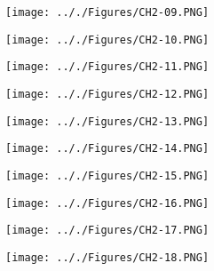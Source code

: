 \documentclass[onecolumn,11pt]{report}
\def\lthtmlcheckvsize{\ifdim\ht\sizebox<\vsize 
  \ifdim\wd\sizebox<\hsize\expandafter\hfill\fi \expandafter\vfill
  \else\expandafter\vss\fi}%
\begin{document}
{\newpage\clearpage
{}%
\texttt{[image: .././Figures/CH2-09.PNG]}%
\lthtmlpictureZ
\lthtmlcheckvsize\clearpage}

{\newpage\clearpage
{}%
\texttt{[image: .././Figures/CH2-10.PNG]}%
\lthtmlpictureZ
\lthtmlcheckvsize\clearpage}

{\newpage\clearpage
{}%
\texttt{[image: .././Figures/CH2-11.PNG]}%
\lthtmlpictureZ
\lthtmlcheckvsize\clearpage}

{\newpage\clearpage
{}%
\texttt{[image: .././Figures/CH2-12.PNG]}%
\lthtmlpictureZ
\lthtmlcheckvsize\clearpage}

{\newpage\clearpage
{}%
\texttt{[image: .././Figures/CH2-13.PNG]}%
\lthtmlpictureZ
\lthtmlcheckvsize\clearpage}

{\newpage\clearpage
{}%
\texttt{[image: .././Figures/CH2-14.PNG]}%
\lthtmlpictureZ
\lthtmlcheckvsize\clearpage}

{\newpage\clearpage
{}%
\texttt{[image: .././Figures/CH2-15.PNG]}%
\lthtmlpictureZ
\lthtmlcheckvsize\clearpage}

{\newpage\clearpage
{}%
\texttt{[image: .././Figures/CH2-16.PNG]}%
\lthtmlpictureZ
\lthtmlcheckvsize\clearpage}

{\newpage\clearpage
{}%
\texttt{[image: .././Figures/CH2-17.PNG]}%
\lthtmlpictureZ
\lthtmlcheckvsize\clearpage}

{\newpage\clearpage
{}%
\texttt{[image: .././Figures/CH2-18.PNG]}%
\lthtmlpictureZ
\lthtmlcheckvsize\clearpage}
\end{document}

